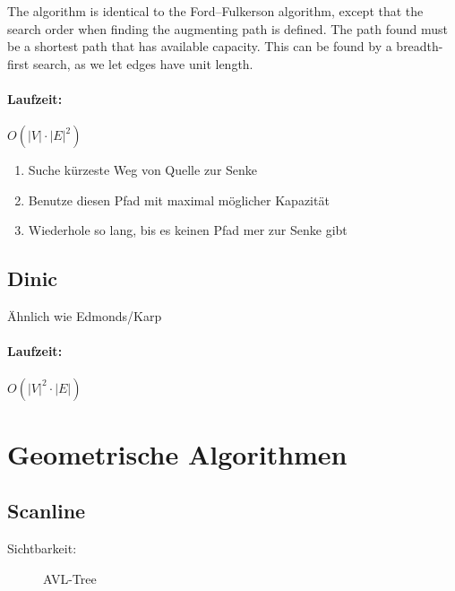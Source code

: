 \documentclass[11pt]{article}
\begin{document}
The algorithm is identical to the Ford–Fulkerson algorithm, except that the search order when finding the augmenting path is defined. The path found must be a shortest path that has available capacity. This can be found by a breadth-first search, as we let edges have unit length.

\paragraph{Laufzeit:} $O(|V|\cdot|E|^2)$

\begin{enumerate}[noitemsep]
	\item Suche kürzeste Weg von Quelle zur Senke
	\item Benutze diesen Pfad mit maximal möglicher Kapazität
	\item Wiederhole so lang, bis es keinen Pfad mer zur Senke gibt
\end{enumerate}

\subsection{Dinic}

Ähnlich wie Edmonds/Karp

\paragraph{Laufzeit:} $O(|V|^2\cdot|E|)$

\section{Geometrische Algorithmen}

\subsection{Scanline}

\begin{description}
	\item[Sichtbarkeit:] AVL-Tree
\end{description}
\end{document}
